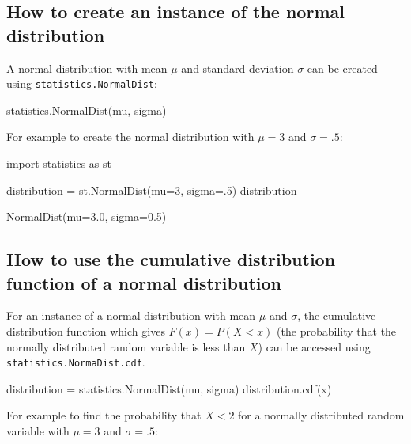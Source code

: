 \subsection{How to create an instance of the normal distribution}
\label{\detokenize{tools-for-mathematics/08-statistics/how/main:how-to-create-an-instance-of-the-normal-distribution}}

A normal distribution with mean \(\mu\) and standard deviation \(\sigma\) can be
created using \texttt{statistics.NormalDist}:


\begin{pyin}
statistics.NormalDist(mu, sigma)
\end{pyin}



For example to create the normal distribution with \(\mu=3\) and \(\sigma=.5\):




\begin{pyin}
import statistics as st

distribution = st.NormalDist(mu=3, sigma=.5)
distribution
\end{pyin}





\begin{raw}
NormalDist(mu=3.0, sigma=0.5)
\end{raw}





\subsection{How to use the cumulative distribution function of a normal distribution}
\label{\detokenize{tools-for-mathematics/08-statistics/how/main:how-to-use-the-cumulative-distribution-function-of-a-normal-distribution}}

For an instance of a normal distribution with mean \(\mu\) and \(\sigma\), the
cumulative distribution function which gives \(F(x)=P(X<x)\) (the probability that
the normally distributed random variable is less than \(X\)) can be accessed using
\texttt{statistics.NormaDist.cdf}.


\begin{pyin}
distribution = statistics.NormalDist(mu, sigma)
distribution.cdf(x)
\end{pyin}



For example to find the probability that \(X<2\) for a normally distributed random
variable with \(\mu=3\) and \(\sigma=.5\):




